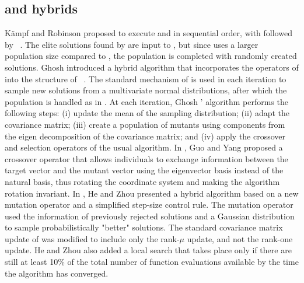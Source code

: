\subsection{\CMAES and \DE hybrids}
Kämpf and Robinson proposed to execute \CMAES and \DE in sequential order, with \CMAES followed by \DE~\cite{KamJerRob09:asoc}.
The elite solutions found by \CMAES are input to \DE, but since \DE uses a larger population size compared to \CMAES, the \DE population is completed with randomly created solutions.
Ghosh \etal introduced a hybrid algorithm that incorporates the operators of \DE into the structure of \CMAES~\cite{GhoDasRoy12:is}.
The standard mechanism of \CMAES is used in each iteration to sample new solutions from a multivariate normal distributions, after which the population is handled as in \DE.
At each iteration, Ghosh \etal' algorithm performs the following steps: (i) update the mean of the sampling distribution; (ii) adapt the covariance matrix;
(iii) create a population of mutants using components from the eigen decomposition of the covariance matrix; and (iv) apply the crossover and selection operators of the usual \DE algorithm.
In \cite{GuoYan14:tevc}, Guo and Yang proposed a crossover operator that allows individuals to exchange information between the target vector and the mutant vector using the eigenvector basis instead of the natural basis, thus rotating the coordinate system and making the algorithm rotation invariant.
In \cite{HeZho18:asoc}, He and Zhou presented a hybrid algorithm based on a new mutation operator and a simplified step-size control rule.
The mutation operator used the information of previously rejected solutions and a Gaussian distribution to sample probabilistically "better" solutions.
The standard covariance matrix update of \CMAES was modified to include only the rank-$\mu$ update, and not the rank-one update.
He and Zhou also added a local search that takes place only if there are still at least 10\% of the total number of function evaluations available by the time the algorithm has converged. 
